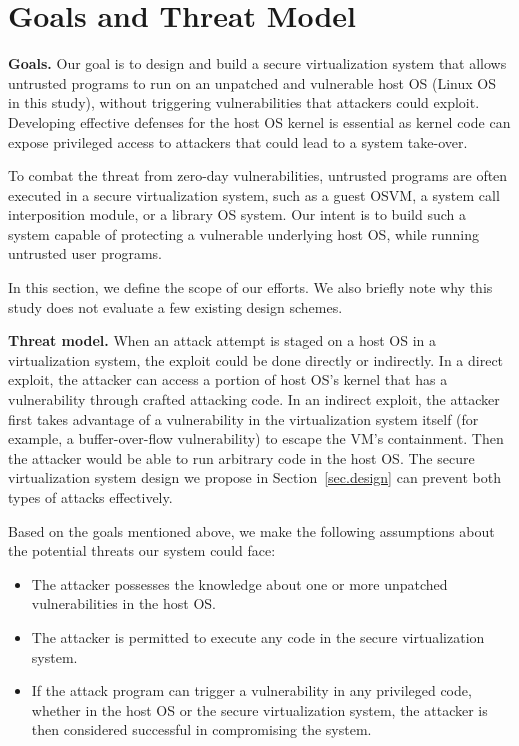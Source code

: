 \section{Goals and Threat Model}
\label{sec.motivation-and-background}

\textbf{Goals.}
Our goal is to design and build a secure virtualization system that allows
untrusted programs to run on an unpatched and vulnerable host OS (Linux OS in
this study), without triggering vulnerabilities that attackers could exploit.
Developing effective defenses for the host OS kernel is essential as kernel code
can expose privileged access to attackers that could lead to a system take-over.

To combat the threat from zero-day vulnerabilities, untrusted programs are often executed in a 
secure virtualization system, such as a guest OSVM, a system call 
interposition module, or a library OS system. Our intent is to
build such a system capable of protecting a vulnerable underlying host OS, 
while running untrusted user programs.

In this section, we define the scope of our efforts. We also briefly note why 
this study does not evaluate a few existing design schemes.

\noindent
\textbf{Threat model.}
When an attack attempt is staged
on a host OS in a virtualization system,
the exploit could be done directly or indirectly.
In a direct exploit, the attacker can access a portion of host OS's kernel
that has a vulnerability through crafted attacking code. In an indirect exploit,
the attacker first takes advantage of a vulnerability in the virtualization system itself 
(for example, a buffer-over-flow vulnerability) 
to escape the VM's containment. Then the attacker would be able to run arbitrary code 
in the host OS. 
The secure virtualization system design we propose
in Section~\ref{sec.design} can prevent both types of attacks effectively.

Based on the goals mentioned above, we make the following assumptions about the
potential threats our system could face:

\begin{itemize}\setlength\itemsep{0em}

\item The attacker possesses the knowledge about one or more unpatched 
vulnerabilities in the host OS.

\item The attacker is permitted to execute any code in the secure 
virtualization system.

\item If the attack program can trigger a vulnerability in any privileged 
code, whether in the host OS or the secure virtualization system, the attacker 
is then considered successful in compromising the system.

\end{itemize}

